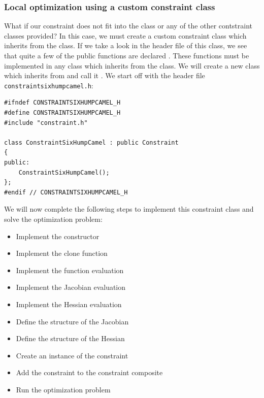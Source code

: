 \subsubsection{Local optimization using a custom constraint class} \label{sec:shcb_custom}
What if our constraint does not fit into the  class or any of the other contstraint classes provided? In this case, we must create a custom constraint class which inherits from the  class. If we take a look in the header file of this class, we see that quite a few of the public functions are declared . These functions must be implemented in any class which inherits from the  class. We will create a new class which inherits from  and call it . We start off with the header file \texttt{constraintsixhumpcamel.h}:
\begin{lstlisting}
#ifndef CONSTRAINTSIXHUMPCAMEL_H
#define CONSTRAINTSIXHUMPCAMEL_H
#include "constraint.h"

class ConstraintSixHumpCamel : public Constraint
{
public:
    ConstraintSixHumpCamel();
};
#endif // CONSTRAINTSIXHUMPCAMEL_H
\end{lstlisting}
We will now complete the following steps to implement this constraint class and solve the optimization problem:
\begin{itemize}
\item Implement the constructor
\item Implement the clone function
\item Implement the function evaluation
\item Implement the Jacobian evaluation
\item Implement the Hessian evaluation
\item Define the structure of the Jacobian
\item Define the structure of the Hessian
\item Create an instance of the constraint
\item Add the constraint to the constraint composite
\item Run the optimization problem
\end{itemize}


